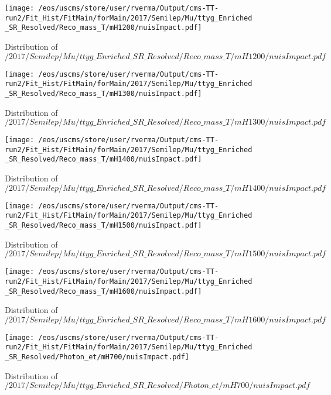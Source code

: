 \begin{figure}
\centering
\texttt{[image: /eos/uscms/store/user/rverma/Output/cms-TT-run2/Fit\_Hist/FitMain/forMain/2017/Semilep/Mu/ttyg\_Enriched\_SR\_Resolved/Reco\_mass\_T/mH1200/nuisImpact.pdf]}
\caption{Distribution of $/2017/Semilep/Mu/ttyg\_Enriched\_SR\_Resolved/Reco\_mass\_T/mH1200/nuisImpact.pdf$}
\end{figure}

\begin{figure}
\centering
\texttt{[image: /eos/uscms/store/user/rverma/Output/cms-TT-run2/Fit\_Hist/FitMain/forMain/2017/Semilep/Mu/ttyg\_Enriched\_SR\_Resolved/Reco\_mass\_T/mH1300/nuisImpact.pdf]}
\caption{Distribution of $/2017/Semilep/Mu/ttyg\_Enriched\_SR\_Resolved/Reco\_mass\_T/mH1300/nuisImpact.pdf$}
\end{figure}

\begin{figure}
\centering
\texttt{[image: /eos/uscms/store/user/rverma/Output/cms-TT-run2/Fit\_Hist/FitMain/forMain/2017/Semilep/Mu/ttyg\_Enriched\_SR\_Resolved/Reco\_mass\_T/mH1400/nuisImpact.pdf]}
\caption{Distribution of $/2017/Semilep/Mu/ttyg\_Enriched\_SR\_Resolved/Reco\_mass\_T/mH1400/nuisImpact.pdf$}
\end{figure}

\begin{figure}
\centering
\texttt{[image: /eos/uscms/store/user/rverma/Output/cms-TT-run2/Fit\_Hist/FitMain/forMain/2017/Semilep/Mu/ttyg\_Enriched\_SR\_Resolved/Reco\_mass\_T/mH1500/nuisImpact.pdf]}
\caption{Distribution of $/2017/Semilep/Mu/ttyg\_Enriched\_SR\_Resolved/Reco\_mass\_T/mH1500/nuisImpact.pdf$}
\end{figure}

\begin{figure}
\centering
\texttt{[image: /eos/uscms/store/user/rverma/Output/cms-TT-run2/Fit\_Hist/FitMain/forMain/2017/Semilep/Mu/ttyg\_Enriched\_SR\_Resolved/Reco\_mass\_T/mH1600/nuisImpact.pdf]}
\caption{Distribution of $/2017/Semilep/Mu/ttyg\_Enriched\_SR\_Resolved/Reco\_mass\_T/mH1600/nuisImpact.pdf$}
\end{figure}

\begin{figure}
\centering
\texttt{[image: /eos/uscms/store/user/rverma/Output/cms-TT-run2/Fit\_Hist/FitMain/forMain/2017/Semilep/Mu/ttyg\_Enriched\_SR\_Resolved/Photon\_et/mH700/nuisImpact.pdf]}
\caption{Distribution of $/2017/Semilep/Mu/ttyg\_Enriched\_SR\_Resolved/Photon\_et/mH700/nuisImpact.pdf$}
\end{figure}

